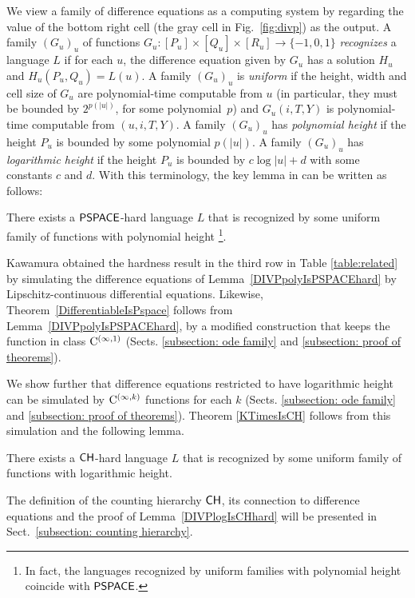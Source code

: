We view a family of difference equations as a computing system by
regarding the value of the bottom right cell (the gray cell in Fig.~\ref{fig:divp}) as the output. 
A family $(G_u)_u$ of functions 
$G_u \colon [P_u] \times [Q_u] \times [R_u] \to \{-1, 0, 1\}$
\emph{recognizes} a language $L$ if for each $u$,
the difference equation given by $G_u$ has a solution $H_u$ 
and $H_u(P_u, Q_u) = L(u)$.
A family $(G_u)_u$ is \emph{uniform} 
if the height, width and cell size of $G_u$ are 
polynomial-time computable from $u$ (in particular, 
they must be bounded by $2^{p(|u|)}$, for some polynomial~$p$)
and $G_u(i, T, Y)$ is polynomial-time computable from $(u, i, T, Y)$.
A family $(G_u)_u$ has \emph{polynomial height} if the height $P_u$ is bounded by some polynomial $p(|u|)$.
A family $(G_u)_u$ has \emph{logarithmic height} if the height $P_u$ is bounded by $c \log |u| + d$ with some constants $c$ and $d$.
With this terminology,
the key lemma in 
\cite[Lemma 4.7]{kawamura2010lipschitz} 
can be written as follows:
\begin{lemma}
 \label{DIVPpolyIsPSPACEhard}
 There exists a $\mathsf{PSPACE}$-hard language $L$ that is recognized by some uniform family of functions with polynomial height%
 \footnote{In fact, the languages recognized by 
 uniform families with polynomial height coincide with $\mathsf{PSPACE}$.
}.
\end{lemma}

Kawamura obtained the hardness result in the third row in Table \ref{table:related} 
by simulating the difference equations of Lemma~\ref{DIVPpolyIsPSPACEhard}
by Lipschitz-continuous differential equations. 
Likewise, 
Theorem~\ref{DifferentiableIsPspace} follows from Lemma~\ref{DIVPpolyIsPSPACEhard},
by a modified construction that keeps 
the function in class $\mathrm C ^{(\infty, 1)}$ 
(Sects. \ref{subsection: ode family} and \ref{subsection: proof of theorems}).

We show further that 
difference equations restricted to have logarithmic height can be simulated by
$\mathrm C ^{(\infty, k)}$ functions for each $k$ 
(Sects. \ref{subsection: ode family} and \ref{subsection: proof of theorems}).
Theorem \ref{KTimesIsCH} follows from this simulation and the following lemma.
\begin{lemma}
 \label{DIVPlogIsCHhard}
 There exists a $\mathsf{CH}$-hard language $L$ that is recognized by some uniform family of functions with logarithmic height.
\end{lemma}

The definition of the counting hierarchy $\mathsf{CH}$, 
its connection to difference equations and 
the proof of Lemma~\ref{DIVPlogIsCHhard} 
will be presented in Sect.~\ref{subsection: counting hierarchy}. 



